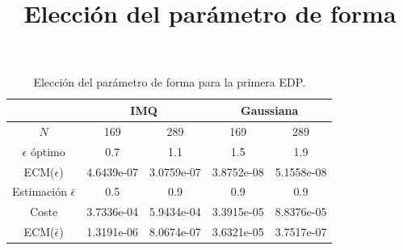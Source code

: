 \documentclass[11pt,a4paper]{article}
\author{}
\date{}
\title{Elección del parámetro de forma}
\begin{document}
\maketitle

 \begin{table}[H]
 \begin{center}
 \caption{Elección del parámetro de forma para la primera EDP.}
 \begin{tabular}{|c|c|c|c|c|}
 \hline
  & \multicolumn{2}{|c|}{IMQ} & \multicolumn{2}{|c|}{Gaussiana}\\
  \hline
  $N$& 169 & 289 & 169 & 289 \\
  \hline
  $\epsilon$ óptimo & 0.7 & 1.1 & 1.5 & 1.9 \\
  ECM($\epsilon$) & 4.6439e-07& 3.0759e-07&3.8752e-08 &5.1558e-08 \\
  Estimación $\bar{\epsilon}$ & 0.5 & 0.9 & 0.9 & 0.9 \\
  Coste & 3.7336e-04&5.9434e-04 &3.3915e-05 & 8.8376e-05\\
  ECM($\bar{\epsilon}$) & 1.3191e-06&8.0674e-07 &3.6321e-05 &3.7517e-07 \\
  \hline
 
 \end{tabular}
 \end{center}
 \end{table}
 
\end{document}
